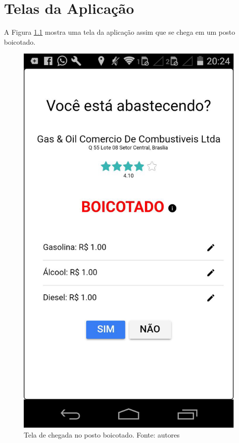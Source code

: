
\chapter{Telas da Aplicação}
\label{chap:telas}

A Figura \ref{img:chegou-posto-boicotado} mostra uma tela da aplicação assim que se chega em um posto boicotado.

\begin{figure}[H]
    \centering
    \includegraphics[scale=0.5]{figuras/chegou-posto.jpg}
    \caption[Tela de chegada no posto boicotado]{Tela de chegada no posto boicotado. Fonte: autores}
    \label{img:chegou-posto-boicotado}
\end{figure}

